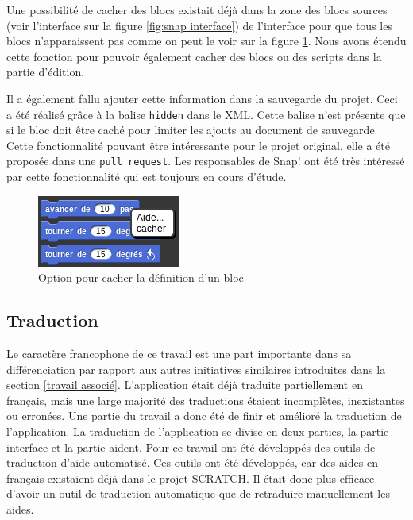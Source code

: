 Une possibilité de cacher des blocs existait déjà dans la zone des blocs sources (voir l'interface sur la figure \ref{fig:snap interface}) de l'interface pour que tous les blocs n'apparaissent pas comme on peut le voir sur la figure \ref{fig:cacher}. Nous avons étendu cette fonction pour pouvoir également cacher des blocs ou des scripts dans la partie d'édition.

Il a également fallu ajouter cette information dans la sauvegarde du projet. Ceci a été réalisé grâce à la balise \texttt{hidden} dans le XML. Cette balise n'est présente que si le bloc doit être caché pour limiter les ajouts au document de sauvegarde.\\

Cette fonctionnalité pouvant être intéressante pour le projet original, elle a été proposée dans une \texttt{pull request}. Les responsables de Snap! ont été très intéressé par cette fonctionnalité qui est toujours en cours d'étude.
\begin{figure}[]
  \begin{center}
    \includegraphics[scale=0.5]{content/7-solution/2-snap/images/cacher}
    \caption{Option pour cacher la définition d'un bloc}
    \label{fig:cacher}
  \end{center}
\end{figure}

\subsection{Traduction}
Le caractère francophone de ce travail est une part importante dans sa différenciation par rapport aux autres initiatives similaires introduites dans la section \ref{travail associé}. L'application était déjà traduite partiellement en français, mais une large majorité des traductions étaient incomplètes, inexistantes ou erronées. Une partie du travail a donc été de finir et amélioré la traduction de l'application. La traduction de l'application se divise en deux parties, la partie interface et la partie aident. Pour ce travail ont été développés des outils de traduction d'aide automatisé. Ces outils ont été développés, car des aides en français existaient déjà dans le projet SCRATCH. Il était donc plus efficace d'avoir un outil de traduction automatique que de retraduire manuellement les aides.

